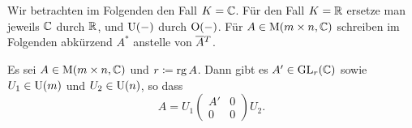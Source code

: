 \section{}
Wir betrachten im Folgenden den Fall $K = \mathbb{C}$.
Für den Fall $K = \mathbb{R}$ ersetze man jeweils $\mathbb{C}$ durch $\mathbb{R}$, und $\operatorname{U}(-)$ durch $\operatorname{O}(-)$.
Für $A \in \operatorname{M}(m \times n, \mathbb{C})$ schreiben im Folgenden abkürzend $A^*$ anstelle von $\overline{A}{}^T$.

\begin{lemma}
  \label{lemma: decomposition}
  Es sei $A \in \operatorname{M}(m \times n, \mathbb{C})$ und $r \coloneqq \operatorname{rg} A$.
  Dann gibt es $A' \in \operatorname{GL}_{r}(\mathbb{C})$ sowie $U_1 \in \operatorname{U}(m)$ und $U_2 \in \operatorname{U}(n)$, so dass
  \[
    A = U_1
        \begin{pmatrix}
          A'  & 0 \\
          0   & 0
        \end{pmatrix}
        U_2.
  \]
\end{lemma}
